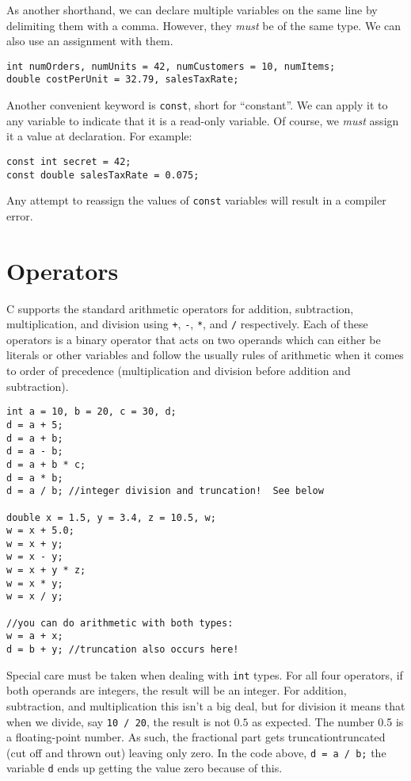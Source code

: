 As another shorthand, we can declare multiple variables on the same line by delimiting
them with a comma.  However, they \emph{must} be of the same type.  We can also 
use an assignment with them. 

\begin{verbatim}
int numOrders, numUnits = 42, numCustomers = 10, numItems;
double costPerUnit = 32.79, salesTaxRate;
\end{verbatim}

Another convenient keyword is \texttt{const}, short for ``constant''.  We can 
apply it to any variable to indicate that it is a read-only variable.  Of course, we
\emph{must} assign it a value at declaration.  For example:

\begin{verbatim}
const int secret = 42;
const double salesTaxRate = 0.075;
\end{verbatim}

Any attempt to reassign the values of \texttt{const} variables will result
in a compiler error.

\section{Operators}

C supports the standard arithmetic operators for addition, subtraction, multiplication, and
division using \texttt{+}, \texttt{-}, \texttt{*}, and
\texttt{/} respectively.  Each of these operators is a binary operator that
acts on two operands which can either be literals or other variables and follow
the usually rules of arithmetic when it comes to order of precedence (multiplication 
and division before addition and subtraction).

\begin{verbatim}
int a = 10, b = 20, c = 30, d;
d = a + 5;
d = a + b;
d = a - b;
d = a + b * c;
d = a * b;
d = a / b; //integer division and truncation!  See below

double x = 1.5, y = 3.4, z = 10.5, w;
w = x + 5.0;
w = x + y;
w = x - y;
w = x + y * z;
w = x * y;
w = x / y;

//you can do arithmetic with both types:
w = a + x;
d = b + y; //truncation also occurs here!
\end{verbatim}

Special care must be taken when dealing with \texttt{int} types.  
For all four operators, if both operands are integers, the result will be an
integer.  For addition, subtraction, and multiplication this isn't a big deal, but
for division it means that when we divide, say \texttt{10 / 20}, the result
is not $0.5$ as expected.  The number 0.5 is a floating-point number.  As
such, the fractional part gets \gls{truncation}{truncated} (cut off and thrown out) leaving
only zero.  In the code above, \texttt{d = a / b;} the variable \texttt{d}
ends up getting the value zero because of this.

